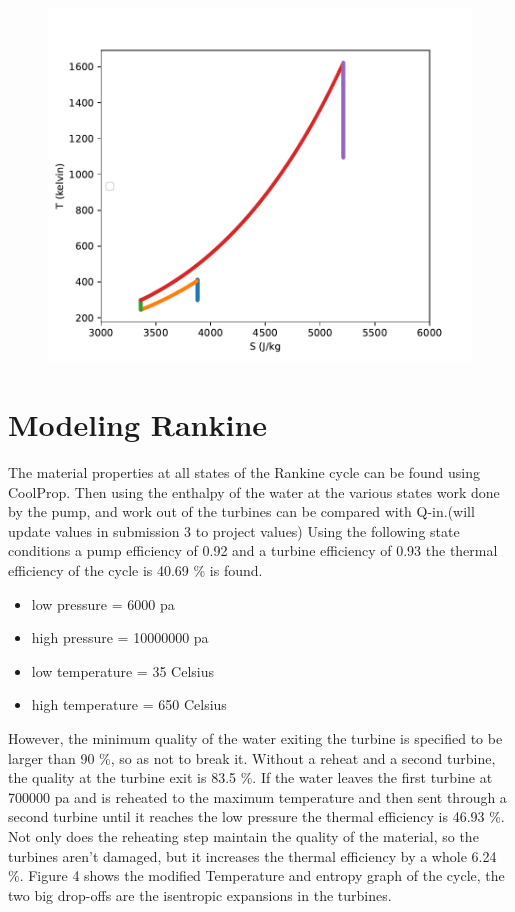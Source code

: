 \documentclass{article}
\begin{document}
\begin{figure}
    \centering
    \includegraphics{BraytonDiagramInitial.pdf}
    \caption{}
    
    \label{fig:my_label}
\end{figure}

\FloatBarrier

\section{Modeling Rankine}
The material properties at all states of the Rankine cycle can be found using CoolProp. Then using the enthalpy of the water at the various states work done by the pump, and work out of the turbines can be compared with Q-in.(will update values in submission 3 to project values) Using the following state conditions a pump efficiency of 0.92 and a turbine efficiency of 0.93 the thermal efficiency of the cycle is 40.69 \% is found.
\begin{itemize}
\item  low pressure = 6000 pa
\item high pressure = 10000000 pa
\item low temperature = 35 Celsius
\item high temperature = 650 Celsius
\end{itemize}

However, the minimum quality of the water exiting the turbine is specified to be larger than 90 \%, so as not to break it. Without a reheat and a second turbine, the quality at the turbine exit is 83.5 \%. If the water leaves the first turbine at 700000 pa and is reheated to the maximum temperature and then sent through a second turbine until it reaches the low pressure the thermal efficiency is 46.93 \%. Not only does the reheating step maintain the quality of the material, so the turbines aren't damaged, but it increases the thermal efficiency by a whole 6.24 \%. Figure 4 shows the modified Temperature and entropy graph of the cycle, the two big drop-offs are the isentropic expansions in the turbines.
\end{document}
